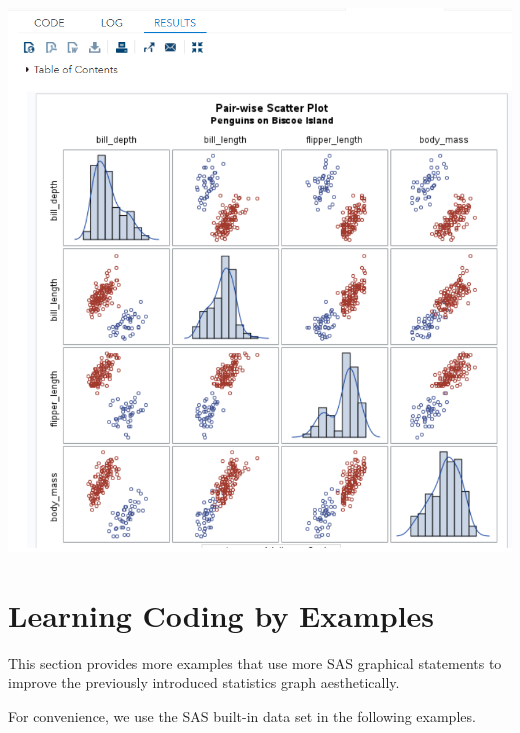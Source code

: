 \documentclass[
]{book}
\begin{document}
\begin{center}\includegraphics[width=1\linewidth]{img06/w06-PairWiseScatter} \end{center}

\hypertarget{learning-coding-by-examples-2}{%
\section{Learning Coding by Examples}\label{learning-coding-by-examples-2}}

This section provides more examples that use more SAS graphical statements to improve the previously introduced statistics graph aesthetically.

For convenience, we use the SAS built-in data set in the following examples.
\end{document}
